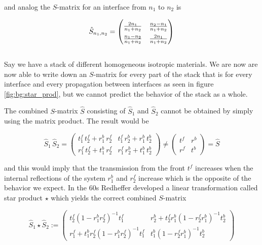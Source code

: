 and analog the $S$-matrix for an interface from $n_1$ to $n_2$ is

\begin{equation}
    \hat S_{n_1, n_2} =
    \begingroup
    \renewcommand*{\arraystretch}{1.5}
        \begin{pmatrix}
            \frac{2 n_1}{n_1 + n_2} & \frac{n_2 - n_1}{n_1 + n_2} \\
            \frac{n_1 - n_2}{n_1 + n_2} & \frac{2 n_1}{n_1 + n_2}
        \end{pmatrix}
    \endgroup
\end{equation}
\\


Say we have a stack of different homogeneous isotropic materials. We are now are now able to write down an $S$-matrix for every part of the stack that is for every interface and every propagation between interfaces as seen in figure \ref{fig:bg:star_prod}, but we cannot predict the behavior of the stack as a whole.

\indent
The combined $S$-matrix $\hat S$ consisting of $\hat S_1$ and $\hat S_2$ cannot be obtained by simply using the matrix product. The result would be

\begin{equation}
    \hat S_1 \, \hat S_2 =
    \begin{pmatrix}
        t^f_1 \, t^f_2 + r^b_1 \, r^f_2 & t^f_1 \, r^b_2 + r^b_1 \, t^b_2 \\
        r^f_1 \, t^f_2 + t^b_1 \, r^f_2 & r^f_1 \, r^b_2 + t^b_1 \, t^b_2
    \end{pmatrix} \neq
    \begin{pmatrix}
        t^f & r^b \\
        r^f & t^b
    \end{pmatrix} =
    \hat S
\end{equation}

and this would imply that the transmission from the front $t^f$ increases when the internal reflections of the system $r^b_1$ and $r^f_2$ increase which is the opposite of the behavior we expect. In the 60s Redheffer \cite{Redheffer1960} developed a linear transformation called star product $\star$ which yields the correct combined $S$-matrix

\begin{equation}\label{eq:bg:star}
    \hat S_1 \star \hat S_2 :=
    \begin{pmatrix}
        t^f_2 (1 - r^b_1 r^f_2)^{-1} t^f_1 &
        r^b_2 + t^f_2 r^b_1 (1 - r^f_2 r^b_1)^{-1} t^b_2\\
        r^f_1 + t^b_1 r^f_2 (1 - r^b_1 r^f_2)^{-1} t^f_1 &
        t^b_1 (1 - r^f_2 r^b_1)^{-1} t^b_2
    \end{pmatrix}
\end{equation}
\\

